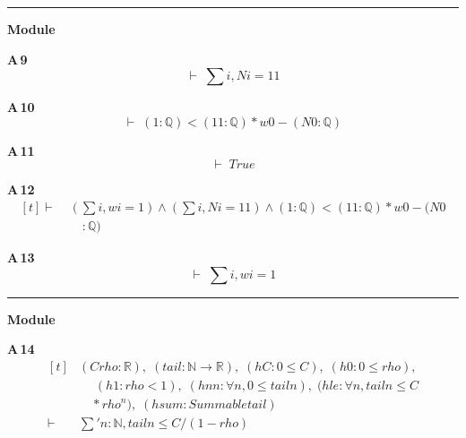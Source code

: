 \vspace{4pt}\noindent\rule{\columnwidth}{0.4pt}\par\vspace{2pt}
\noindent\textbf{Module }\par\vspace{3pt}

\noindent\textbf{A\,9}\quad{}
{\footnotesize\[ \vdash\; \textstyle\sum \mathit{i}, \mathit{N} \mathit{i} = 11 \]}

\noindent\textbf{A\,10}\quad{}
{\footnotesize\[ \vdash\; (1 : \mathbb{Q} ) < (11 : \mathbb{Q} ) * \mathit{w} 0 - (\mathit{N} 0 : \mathbb{Q} ) \]}

\noindent\textbf{A\,11}\quad{}
{\footnotesize\[ \vdash\; \mathit{True} \]}

\noindent\textbf{A\,12}\quad{}
{\footnotesize\[ \begin{aligned}[t]
\vdash\;&(\textstyle\sum \mathit{i}, \mathit{w} \mathit{i} = 1) \wedge (\textstyle\sum \mathit{i}, \mathit{N} \mathit{i} = 11) \wedge (1 : \mathbb{Q} ) < (11 : \mathbb{Q} ) * \mathit{w} 0 - (\mathit{N} 0\\
&\quad : \mathbb{Q} )
\end{aligned} \]}

\noindent\textbf{A\,13}\quad{}
{\footnotesize\[ \vdash\; \textstyle\sum \mathit{i}, \mathit{w} \mathit{i} = 1 \]}

\vspace{4pt}\noindent\rule{\columnwidth}{0.4pt}\par\vspace{2pt}
\noindent\textbf{Module }\par\vspace{3pt}

\noindent\textbf{A\,14}\quad{}
{\footnotesize\[ \begin{aligned}[t]
&(\mathit{C} \mathit{rho} : \mathbb{R} ),\; (\mathit{tail} : \mathbb{N} \to \mathbb{R} ),\; (\mathit{hC} : 0 \leq \mathit{C}),\; (\mathit{h0} : 0 \leq \mathit{rho}),\\
&\quad \; (\mathit{h1} : \mathit{rho} < 1),\; (\mathit{hnn} : \forall \mathit{n}, 0 \leq \mathit{tail} \mathit{n}),\; (\mathit{hle} : \forall \mathit{n}, \mathit{tail} \mathit{n} \leq \mathit{C}\\
&\quad * \mathit{rho} ^{\mathit{n}}),\; (\mathit{hsum} : \mathit{Summable} \mathit{tail})\\
\vdash\;&\textstyle\sum ' \mathit{n} : \mathbb{N} , \mathit{tail} \mathit{n} \leq \mathit{C} / (1 - \mathit{rho})
\end{aligned} \]}

